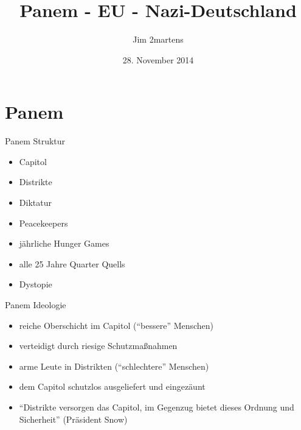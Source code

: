 \documentclass{beamer}
\begin{document}
\author{Jim 2martens}
\title{Panem - EU - Nazi-Deutschland}
\date{28. November 2014}

	\begin{frame}
		\titlepage
	\end{frame}
	
	\section{Panem}
	\begin{frame}{Panem Struktur}
		\begin{itemize}
			\item Capitol
			\item Distrikte
			\item Diktatur
			\item Peacekeepers
			\item jährliche Hunger Games
			\item alle 25 Jahre Quarter Quells
			\item Dystopie
		\end{itemize}
	\end{frame}
	
	\begin{frame}{Panem Ideologie}
		\begin{itemize}
			\item reiche Oberschicht im Capitol ("`bessere"' Menschen)
			\item verteidigt durch riesige Schutzmaßnahmen
			\item arme Leute in Distrikten ("`schlechtere"' Menschen)
			\item dem Capitol schutzlos ausgeliefert und eingezäunt
			\item "`Distrikte versorgen das Capitol, im Gegenzug bietet dieses Ordnung und Sicherheit"' (Präsident Snow)
		\end{itemize}
	\end{frame}
	
\end{document}
